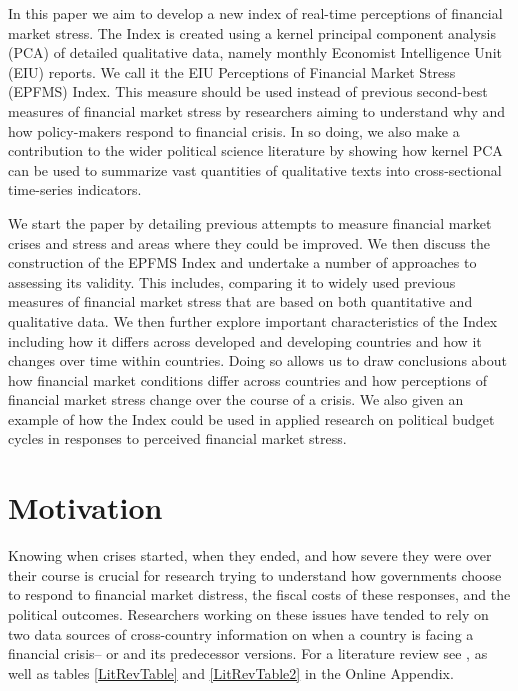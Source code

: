\documentclass[]{article}
\begin{document}
In this paper we aim to develop a new index of real-time perceptions of financial market stress. The Index is created using a kernel principal component analysis (PCA) of detailed qualitative data, namely monthly Economist Intelligence Unit (EIU) reports. We call it the EIU Perceptions of
Financial Market Stress (EPFMS) Index. This measure should be used instead of previous second-best measures of financial market stress by researchers aiming to understand why and how policy-makers respond to financial crisis. In so doing, we also make a contribution to the wider political science literature by showing how kernel PCA can be used to summarize vast quantities of qualitative texts into cross-sectional time-series
indicators.

We start the paper by detailing previous attempts to measure financial market crises and stress and areas where they could be improved. We then discuss the construction of the EPFMS Index and undertake a number of approaches to assessing its validity. This includes, comparing it to widely used previous measures of financial market stress that are based on both quantitative and qualitative data. We then further explore important characteristics of the Index including how it differs across developed and developing countries and how it changes over time within countries. Doing so allows us to draw conclusions about how financial market conditions differ across countries and how perceptions of financial market stress change over the course of a crisis. We also given an example of how the Index could be used in applied research on political budget cycles in responses to perceived financial market stress.

\section{Motivation}\label{motivation}

Knowing when crises started, when they ended, and how severe they were over their course is crucial for research trying to understand how governments choose to respond to financial market distress, the fiscal costs of these responses, and the political outcomes. Researchers working on these issues have tended to rely on two data sources of cross-country information on when a country is facing a financial crisis--\cite{Reinhart2009,ReinhartRog2010} or \cite{laeven2013} and its predecessor versions. For a literature review see \cite{GandrudHallerberg2015}, as well as tables \ref{LitRevTable} and \ref{LitRevTable2} in the Online Appendix.
\end{document}
